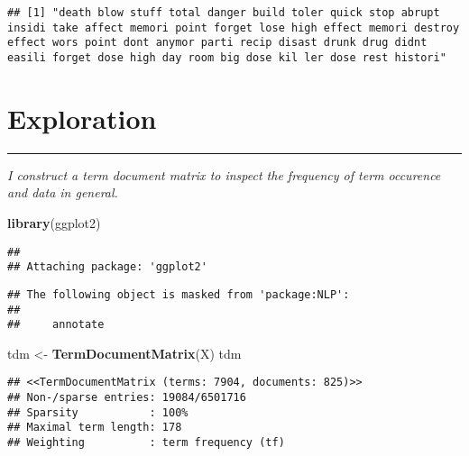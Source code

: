 \documentclass[]{article}
\newenvironment{Shaded}{\begin{snugshade}}{\end{snugshade}}
\newcommand{\DecValTok}[1]{\textcolor[rgb]{0.00,0.00,0.81}{#1}}
\newcommand{\KeywordTok}[1]{\textcolor[rgb]{0.13,0.29,0.53}{\textbf{#1}}}
\newcommand{\NormalTok}[1]{#1}
\newcommand{\OperatorTok}[1]{\textcolor[rgb]{0.81,0.36,0.00}{\textbf{#1}}}
\newcommand{\StringTok}[1]{\textcolor[rgb]{0.31,0.60,0.02}{#1}}
\begin{document}
\begin{Shaded}
\end{Shaded}

\begin{verbatim}
## [1] "death blow stuff total danger build toler quick stop abrupt insidi take affect memori point forget lose high effect memori destroy effect wors point dont anymor parti recip disast drunk drug didnt easili forget dose high day room big dose kil ler dose rest histori"
\end{verbatim}

\hypertarget{exploration}{%
\section{Exploration}\label{exploration}}

\begin{center}\rule{0.5\linewidth}{\linethickness}\end{center}

\emph{I construct a term document matrix to inspect the frequency of
term occurence and data in general.}

\begin{Shaded}
\begin{Highlighting}[]
\KeywordTok{library}\NormalTok{(ggplot2)}
\end{Highlighting}
\end{Shaded}

\begin{verbatim}
## 
## Attaching package: 'ggplot2'
\end{verbatim}

\begin{verbatim}
## The following object is masked from 'package:NLP':
## 
##     annotate
\end{verbatim}

\begin{Shaded}
\begin{Highlighting}[]
\NormalTok{tdm <-}\StringTok{ }\KeywordTok{TermDocumentMatrix}\NormalTok{(X)}
\NormalTok{tdm}
\end{Highlighting}
\end{Shaded}

\begin{verbatim}
## <<TermDocumentMatrix (terms: 7904, documents: 825)>>
## Non-/sparse entries: 19084/6501716
## Sparsity           : 100%
## Maximal term length: 178
## Weighting          : term frequency (tf)
\end{verbatim}
\end{document}
